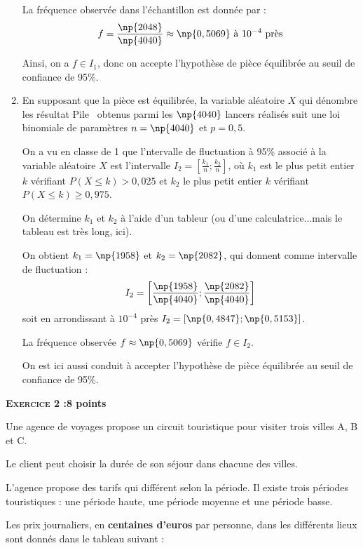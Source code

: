 \documentclass[12pt,french]{book}
\begin{document}
\begin{spacing}{1.2}
\begin{enumerate}
La fréquence observée dans l'échantillon est donnée par :
\[f=\frac{\np{2048}}{\np{4040}}\approx \np{0,5069}~\text{à}~10^{-4}~\text{près}\]

Ainsi, on a $f\in I_1$, donc on accepte l'hypothèse de pièce équilibrée au seuil de confiance de 95\%.

\item En supposant que la pièce est équilibrée, la variable aléatoire $X$ qui dénombre les résultat \og Pile\fg~ obtenus parmi les $\np{4040}$ lancers réalisés suit une loi binomiale de paramètres $n=\np{4040}$ et $p=0,5$.

On a vu en classe de 1 que l'ntervalle de fluctuation à 95\% associé à la variable aléatoire $X$ est l'intervalle $I_2=\left[\frac{k_1}{n};\frac{k_2}{n}\right]$, où $k_1$ est le plus petit entier $k$ vérifiant $P(X\leq k)> 0,025$ et $k_2$ le plus petit entier $k$ vérifiant $P(X\leq k)\geq 0,975$.

On détermine $k_1$ et $k_2$ à l'aide d'un tableur (ou d'une calculatrice...mais le tableau est très long, ici).

On obtient $k_1=\np{1958}$ et $k_2=\np{2082}$, qui donnent comme intervalle de fluctuation :
\[I_2=\left[\frac{\np{1958}}{\np{4040}};\frac{\np{2082}}{\np{4040}}\right]\]
soit en arrondissant à $10^{-4}$ près $I_2=[\np{0,4847};\np{0,5153}]$.

La fréquence observée $f\approx \np{0,5069}$ vérifie $f\in I_2$.

On est ici aussi conduit à accepter l'hypothèse de pièce équilibrée au seuil de confiance de 95\%.
\end{enumerate}

\newpage
\textbf{\textsc{Exercice 2 :}\hfill 8 points}%
\medskip

Une agence de voyages propose un circuit touristique pour visiter trois villes A, B et C.

Le client peut choisir la durée de son séjour dans chacune des villes.

L'agence propose des tarifs qui différent selon la période. Il existe trois périodes touristiques : une période haute, une période moyenne et une période basse.

Les prix journaliers, en \textbf{centaines d'euros} par personne, dans les différents lieux sont donnés dans le tableau suivant :


\end{spacing}
\end{document}
